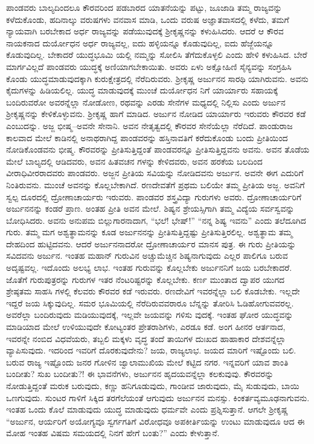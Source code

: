 ಪಾಂಡವರು ಬಾಲ್ಯದಿಂದಲೂ ಕೌರವರಿಂದ ಪಡಬಾರದ ಯಾತನೆಯನ್ನು ಪಟ್ಟು, ಜೂಜಾಡಿ ತಮ್ಮ ರಾಜ್ಯವನ್ನು ಕಳೆದುಕೊಂಡು, ಹದಿನಾಲ್ಕು ವರುಷಗಳು ವನವಾಸ ಮಾಡಿ, ಒಂದು ವರುಷ ಅಜ್ಞಾತವಾಸದಲ್ಲಿ ಕಳೆದು, ತಮಗೆ ನ್ಯಾಯವಾಗಿ ಬರಬೇಕಾದ ಅರ್ಧ ರಾಜ್ಯವನ್ನು ಪಡೆಯುವುದಕ್ಕೆ ಶ್ರೀಕೃಷ್ಣನನ್ನು ಕಳುಹಿಸಿದರು. ಆದರೆ ಆ ಕೌರವ ನಾಯಕನಾದ ದುರ್ಯೋಧನ ಅರ್ಧ ರಾಜ್ಯವಲ್ಲ, ಐದು ಹಳ್ಳಿಯನ್ನೂ ಕೊಡುವುದಿಲ್ಲ, ಐದು ಹೆಜ್ಜೆಯನ್ನೂ ಕೊಡುವುದಿಲ್ಲ. ಬೇಕಾದರೆ ಯುದ್ಧಭೂಮಿ ಯಲ್ಲಿ ನಮ್ಮನ್ನು ಸೋಲಿಸಿ ತೆಗೆದುಕೊಳ್ಳಲಿ ಎಂದು ಹೇಳಿ ಕಳುಹಿಸಿದ. ಬೇರೆ ಮಾರ್ಗವಿಲ್ಲದೆ ಪಾಂಡವರು ಯುದ್ಧಕ್ಕೆ ಅಣಿಯಾಗಬೇಕಾಯಿತು. ಅವರು ಏಳು ಅಕ್ಷೋಹಿಣಿ ಸೈನ್ಯವನ್ನು ಸಂಗ್ರಹಿಸಿ ಕೊಂಡು ಯುದ್ಧಮಾಡುವುದಕ್ಕಾಗಿ ಕುರುಕ್ಷೇತ್ರದಲ್ಲಿ ನೆರೆದಿರುವರು. ಶ್ರೀಕೃಷ್ಣ ಅರ್ಜುನನ ಸಾರಥಿ ಯಾಗಿರುವನು. ಅವನು ಕೈದುಗಳನ್ನು ಹಿಡಿಯಲಿಲ್ಲ. ಯುದ್ಧ ಮಾಡುವುದಕ್ಕೆ ಮುಂಚೆ ದುರ್ಯೋಧನ ನಿಗೆ ಯಾರ್ಯಾರು ಸಹಾಯಕ್ಕೆ ಬಂದಿರುವರೋ ಅವರನ್ನೆಲ್ಲಾ ನೋಡೋಣ, ರಥವನ್ನು ಎರಡು ಸೇನೆಗಳ ಮಧ್ಯದಲ್ಲಿ ನಿಲ್ಲಿಸು ಎಂದು ಅರ್ಜುನ ಶ್ರೀಕೃಷ್ಣನನ್ನು ಕೇಳಿಕೊಳ್ಳುವನು. ಶ್ರೀಕೃಷ್ಣ ಹಾಗೆ ಮಾಡಿದ. ಅರ್ಜುನ ನೋಡಿದ ಯಾರ್ಯಾರು ಇರುವರು ಕೌರವರ ಕಡೆ ಎಂಬುದನ್ನು. ಅಜ್ಜ ಭೀಷ್ಮ–ಅವನೇ ಸೇನಾನಿ. ಅವನ ನೇತೃತ್ವದಲ್ಲಿ ಕೌರವರ ಸೇನೆಯೆಲ್ಲಾ ನೆರೆದಿದೆ. ಪಾಂಡುರಾಜ ಕಾಲವಾದ ಮೇಲೆ ಕಾಡಿನಲ್ಲಿ ಅನಾಥರಾಗಿದ್ದ ಪಾಂಡವರನ್ನು ಹಸ್ತಿನಾವತಿಗೆ ಕರೆದುಕೊಂಡು ಬಂದು ಪ್ರೀತಿಯಿಂದ ನೋಡಿಕೊಂಡವನು ಭೀಷ್ಮ. ಕೌರವರನ್ನು ಪ್ರೀತಿಸುತ್ತಿದ್ದಂತೆ ಪಾಂಡವರನ್ನೂ ಪ್ರೀತಿಸುತ್ತಿದ್ದವನು ಅವನು. ಅವನ ತೊಡೆಯ ಮೇಲೆ ಬಾಲ್ಯದಲ್ಲಿ ಆಡಿದವರು, ಅವನ ಹಿತವಚನ ಗಳನ್ನು ಕೇಳಿದವರು, ಅವನ ಹರಕೆಯ ಬಲದಿಂದ ವೀರಾಧಿವೀರರಾದವರು ಪಾಂಡವರು. ಅಜ್ಜನ ಪ್ರೀತಿಯ ಸವಿಯನ್ನು ನೋಡಿದವನು ಅರ್ಜುನ. ಅವನೇ ಈಗ ಎದುರಿಗೆ ನಿಂತಿರುವನು. ಮುಂಚೆ ಅವನನ್ನು ಕೊಲ್ಲಬೇಕಾಗಿದೆ. ರಣದೇವತೆಗೆ ಪ್ರಥಮ ಬಲಿಯೇ ತಮ್ಮ ಪ್ರೀತಿಯ ಅಜ್ಜ. ಅವನಿಗೆ ಸ್ವಲ್ಪ ದೂರದಲ್ಲಿ ದ್ರೋಣಾಚಾರ್ಯರು ಇರುವರು. ಪಾಂಡವರ ಶಸ್ತ್ರವಿದ್ಯಾ ಗುರುಗಳು ಅವರು. ದ್ರೋಣಾಚಾರ್ಯರಿಗೆ ಅರ್ಜುನನನ್ನು ಕಂಡರೆ ಪ್ರಾಣ. ಅಂತಹ ಪ್ರೀತಿ ಅವನ ಮೇಲೆ. ಶಿಷ್ಯನ ಶ್ರೇಯಸ್ಸಿಗಾಗಿ ತಮ್ಮ ವಿದ್ಯೆಯ ಸರ್ವಸ್ವವನ್ನು ಬೋಧಿಸಿದರು. ಅವನು ಅನುಪಮ ಬಿಲ್ಲುಗಾರನಾದಾಗ, “ಭಲೆ! ಭೇಷ್​!” “ನನ್ನ ಶಿಷ್ಯ ಇವನು” ಎಂದು ತಲೆದೂಗಿದ ಗುರು. ತಮ್ಮ ಮಗ ಅಶ್ವತ್ಥಾಮನನ್ನು ಕೂಡ ಅರ್ಜುನನನ್ನು ಪ್ರೀತಿಸುತ್ತಿದ್ದಷ್ಟು ಪ್ರೀತಿಸುತ್ತಿರಲಿಲ್ಲ. ಅಶ್ವತ್ಥಾಮ ತಮ್ಮ ದೇಹದಿಂದ ಹುಟ್ಟಿದವನು. ಆದರೆ ಅರ್ಜುನನಾದರೋ ದ್ರೋಣಾಚಾರ್ಯರ ಮಾನಸ ಪುತ್ರ. ಈ ಗುರು ಪ್ರೀತಿಯನ್ನು ಸವಿದವನು ಅರ್ಜುನ. ಇಂತಹ ಮಹಾನ್ ಗುರುವಿನ ಅಚ್ಚುಮೆಚ್ಚಿನ ಶಿಷ್ಯನಾಗುವುದು ಎಲ್ಲರ ಪಾಲಿಗೂ ಬರುವ ಅದೃಷ್ಟವಲ್ಲ. ಇದೊಂದು ಅಲಭ್ಯ ಲಾಭ. ಇಂತಹ ಗುರುವನ್ನು ಕೊಲ್ಲಬೇಕು ಅರ್ಜುನನಿಗೆ ಜಯ ಬರಬೇಕಾದರೆ. ಜೊತೆಗೆ ಗುರುಪುತ್ರರನ್ನು ಗುರುಗಳ ಇತರ ನೆಂಟರಿಷ್ಟರನ್ನು ಕೊಲ್ಲಬೇಕು. ಕರ್ಣ ಮುಂತಾದ ದ್ವಾಪರ ಯುಗದ ಶ್ರೇಷ್ಠತಮ ಸಾಹಸಿ ಗಳಲ್ಲಿ ಕೆಲವರು ಕೌರವರ ಕಡೆ ಇರುವರು. ರಣದೇವಿಗೆ ಇವರನ್ನೆಲ್ಲಾ ಬಲಿ ಕೊಡಬೇಕು. ಇಲ್ಲದೇ ಇದ್ದರೆ ಜಯ ಸಿಕ್ಕುವುದಿಲ್ಲ. ಸಮರ ಭೂಮಿಯಲ್ಲಿ ನೆರೆದಿರುವವರಾರೂ ಬೆನ್ನನ್ನು ತೋರಿಸಿ ಓಡಿಹೋಗುವವರಲ್ಲ. ಅವರೆಲ್ಲಾ ಬಂದಿರುವುದು ಮಡಿಯುವುದಕ್ಕೆ, ಇಲ್ಲವೇ ಜಯವನ್ನು ಗಳಿಸು ವುದಕ್ಕೆ. ಇಂತಹ ಘೋರ ಯುದ್ಧವನ್ನು ಮಾಡಿಯಾದ ಮೇಲೆ ಉಳಿಯುವುದೇ ಕೋಟ್ಯಂತರ ಪ್ರೇತರಾಶಿಗಳು, ಎರಡೂ ಕಡೆ. ಅಂಗ ಹೀನರ ಆರ್ತನಾದ, ಇವರನ್ನೇ ನಂಬಿದ ವಿಧವೆಯರು, ತಬ್ಬಲಿ ಮಕ್ಕಳು ವೃದ್ಧ ತಂದೆ ತಾಯಿಗಳ ದುಃಖದ ಹಾಹಾಕಾರ ದೇಶವನ್ನೆಲ್ಲಾ ವ್ಯಾಪಿಸುವುದು. ಇದರಿಂದ ಇವರಿಗೆ ದೊರಕುವುದೇನು? ಜಯ, ರಾಜ್ಯಲಾಭ. ಜಯದ ಮಾರಿಗೆ ಇಷ್ಟೊಂದು ಬಲಿ. ಬರುವ ರಾಜ್ಯ ಇಷ್ಟೊಂದು ಜನರ ಗೋಳಿನ ಜ್ವಾಲಾಮುಖಿಯ ಮೇಲೆ ಕಟ್ಟಿದ ನಗರ. ಇನ್ನವರಿಗೆ ಯಾವ ಶಾಂತಿ ಬಂದೀತು? ಸುಖ ಬಂದೀತು?! ಈ ಭಾವನೆಗಳು, ಅರ್ಜುನನ ಹೃದಯವನ್ನೆಲ್ಲಾ ಕಲಕುವುವು. ಕೌರವರನ್ನು ನೋಡುತ್ತಿದ್ದಂತೆ ಮರುಕ ಬರುವುದು, ಕಣ್ಣು ಹನಿಗೂಡುವುದು, ಗಾಂಡೀವ ಜಾರುವುದು, ಮೈ ಸುಡುವುದು, ಬಾಯಿ ಒಣಗುವುದು. ಸುಂಟರ ಗಾಳಿಗೆ ಸಿಕ್ಕಿದ ತರಗೆಲೆಯಂತೆ ಆಗುವುದು ಅರ್ಜುನನ ಮನಸ್ಸು. ಕಿಂಕರ್ತವ್ಯಮೂಢನಾಗುವನು. ಇಂತಹ ಒಂದು ಕೊಲೆ ಮಾಡುವುದು ಯುದ್ಧ ಮಾಡುವುದು ಧರ್ಮವೇ ಎಂದು ಪ್ರಶ್ನಿಸುತ್ತಾನೆ. ಆಗಲೇ ಶ್ರೀಕೃಷ್ಣ “ಅರ್ಜುನ, ಆರ್ಯರಿಗೆ ಅಯೋಗ್ಯವೂ ಸ್ವರ್ಗಗತಿಗೆ ವಿರೋಧವೂ ಅಪಕೀರ್ತಿಯನ್ನು ಉಂಟು ಮಾಡುವುದೂ ಆದ ಈ ಮೋಹ ಇಂತಹ ವಿಷಮ ಸಮಯದಲ್ಲಿ ನಿನಗೆ ಹೇಗೆ ಬಂತು?” ಎಂದು ಕೇಳುತ್ತಾನೆ.

